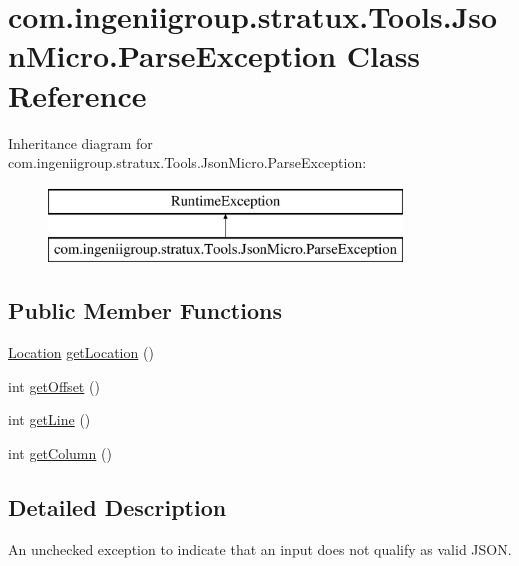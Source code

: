 \hypertarget{classcom_1_1ingeniigroup_1_1stratux_1_1_tools_1_1_json_micro_1_1_parse_exception}{}\section{com.\+ingeniigroup.\+stratux.\+Tools.\+Json\+Micro.\+Parse\+Exception Class Reference}
\label{classcom_1_1ingeniigroup_1_1stratux_1_1_tools_1_1_json_micro_1_1_parse_exception}
Inheritance diagram for com.\+ingeniigroup.\+stratux.\+Tools.\+Json\+Micro.\+Parse\+Exception\+:\begin{figure}[H]
\begin{center}
\leavevmode
\includegraphics[height=2.000000cm]{classcom_1_1ingeniigroup_1_1stratux_1_1_tools_1_1_json_micro_1_1_parse_exception}
\end{center}
\end{figure}
\subsection*{Public Member Functions}
\begin{DoxyCompactItemize}
\item 
\hyperlink{classcom_1_1ingeniigroup_1_1stratux_1_1_tools_1_1_json_micro_1_1_location}{Location} \hyperlink{classcom_1_1ingeniigroup_1_1stratux_1_1_tools_1_1_json_micro_1_1_parse_exception_afdae6799272dd08bfff13f37bc91396a}{get\+Location} ()
\item 
int \hyperlink{classcom_1_1ingeniigroup_1_1stratux_1_1_tools_1_1_json_micro_1_1_parse_exception_a245077b044874da65760943002ffdfa0}{get\+Offset} ()
\item 
int \hyperlink{classcom_1_1ingeniigroup_1_1stratux_1_1_tools_1_1_json_micro_1_1_parse_exception_a370100238cf4df0c31ebcc948485f8ca}{get\+Line} ()
\item 
int \hyperlink{classcom_1_1ingeniigroup_1_1stratux_1_1_tools_1_1_json_micro_1_1_parse_exception_aa68b139df34865bd7e2b4436c817b153}{get\+Column} ()
\end{DoxyCompactItemize}


\subsection{Detailed Description}
An unchecked exception to indicate that an input does not qualify as valid J\+S\+ON. 

